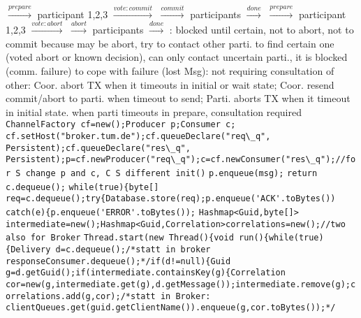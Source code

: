   
$\overset{prepare}{\rightarrow}$
participant 1,2,3
$\overset{vote:commit}{\rightarrow}$
$\overset{commit}{\rightarrow}$
participants
$\overset{done}{\rightarrow}$
\textbar \textbar \textbar
{}
$\overset{prepare}{\rightarrow}$
participant 1,2,3
$\overset{vote:abort}{\rightarrow}$
$\overset{abort}{\rightarrow}$
participants
$\overset{done}{\rightarrow}$
:
 blocked until certain,
not to abort,
not to commit because  may be abort,
try to contact other parti. to find certain one
(voted abort or known decision),
can only contact uncertain parti., it is blocked (comm. failure)
to cope with failure (lost Msg):
not requiring consultation of other:
Coor. abort TX when it timeouts in initial or wait state;
Coor. resend commit/abort to parti. when timeout to send;
Parti. aborts TX when it timeout in initial state.
 when parti timeouts in prepare,
consultation required
%
%
%
%
%
\\
\lstinline{ChannelFactory cf=new();Producer p;Consumer c;}
\lstinline{cf.setHost("broker.tum.de");cf.queueDeclare("req\_q", Persistent);cf.queueDeclare("res\_q", Persistent);p=cf.newProducer("req\_q");c=cf.newConsumer("res\_q");//for S change p and c, C S different init()}
\lstinline{p.enqueue(msg);}
\lstinline{return c.dequeue();}
\lstinline{while(true){byte[] req=c.dequeue();try{Database.store(req);p.enqueue('ACK'.toBytes()) catch(e){p.enqueue('ERROR'.toBytes());}
%
%
%
\bluetext{+}
\lstinline{Hashmap<Guid,byte[]> intermediate=new();Hashmap<Guid,Correlation>correlations=new();//two also for Broker}
\lstinline{Thread.start(new Thread(){void run(){while(true){Delivery d=c.dequeue();/*statt in broker responseConsumer.dequeue();*/if(d!=null){Guid g=d.getGuid();if(intermediate.containsKey(g){Correlation cor=new(g,intermediate.get(g),d.getMessage());intermediate.remove(g);correlations.add(g,cor);/*statt in Broker: clientQueues.get(guid.getClientName()).enqueue(g,cor.toBytes());*/}
